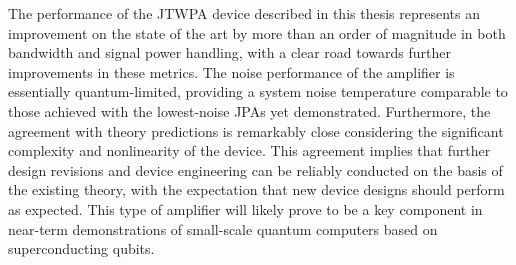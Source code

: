 The performance of the JTWPA device described in this thesis represents an improvement on the state of the art by more than an order of magnitude in both bandwidth and signal power handling, with a clear road towards further improvements in these metrics.  The noise performance of the amplifier is essentially quantum-limited, providing a system noise temperature comparable to those achieved with the lowest-noise JPAs yet demonstrated.  Furthermore, the agreement with theory predictions is remarkably close considering the significant complexity and nonlinearity of the device.  This agreement implies that further design revisions and device engineering can be reliably conducted on the basis of the existing theory, with the expectation that new device designs should perform as expected.  This type of amplifier will likely prove to be a key component in near-term demonstrations of small-scale quantum computers based on superconducting qubits.